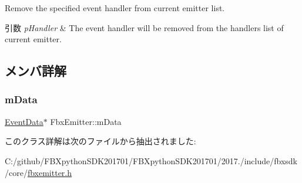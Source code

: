 Remove the specified event handler from current emitter list. 
\begin{DoxyParams}{引数}
{\em p\+Handler} & The event handler will be removed from the handlers list of current emitter. \\
\hline
\end{DoxyParams}


\subsection{メンバ詳解}
\mbox{\label{class_fbx_emitter_ad2d8605b0a35c0fd4172ac0c55483582}} 
\subsubsection{\texorpdfstring{m\+Data}{mData}}
{\footnotesize\ttfamily \hyperlink{struct_fbx_emitter_1_1_event_data}{Event\+Data}$\ast$ Fbx\+Emitter\+::m\+Data\hspace{0.3cm}{\ttfamily [protected]}}



このクラス詳解は次のファイルから抽出されました\+:\begin{DoxyCompactItemize}
\item 
C\+:/github/\+F\+B\+Xpython\+S\+D\+K201701/\+F\+B\+Xpython\+S\+D\+K201701/2017./include/fbxsdk/core/\hyperlink{fbxemitter_8h}{fbxemitter.\+h}\end{DoxyCompactItemize}
